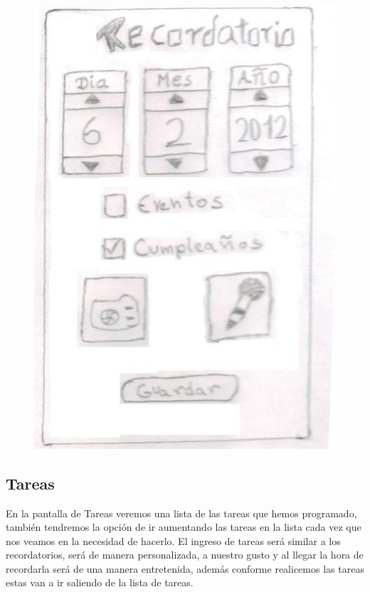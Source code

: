 \documentclass[12pt]{article}
\begin{document}
\begin{figure}[h]
\centering
\vspace{0.3in}\includegraphics[scale=0.5]{Twin4}
\end{figure}

\newpage
\subsection{Tareas}
En la pantalla de Tareas veremos una lista de las tareas que hemos programado, tambi\'en tendremos la opci\'on de ir aumentando las tareas en la lista cada vez que nos veamos en la necesidad de hacerlo. El ingreso de tareas ser\'a similar a los recordatorios, ser\'a de manera personalizada, a nuestro gusto y al llegar la hora de recordarla ser\'a de una manera entretenida, adem\'as conforme realicemos las tareas estas van a ir saliendo de la lista de tareas.
\end{document}
